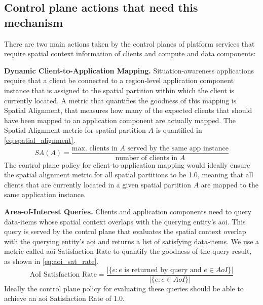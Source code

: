 \subsection{Control plane actions that need this mechanism}
There are two main actions taken by the control planes of platform services that require spatial context information of clients and compute and data components:
\par \noindent \textbf{Dynamic Client-to-Application Mapping. } Situation-awareness applications require that a client be connected to a region-level application component instance that is assigned to the spatial partition within which the client is currently located. A metric that quantifies the goodness of this mapping is Spatial Alignment, that measures how many of the expected clients that should have been mapped to an application component are actually mapped. The Spatial Alignment metric for spatial partition $A$ is quantified in \cref{eq:spatial_alignment}.
\begin{equation}
SA \left( A \right) = \dfrac{\text{max. clients in }A\text{ served by the same app instance}}{\text{number of clients in }A}
\label{eq:spatial_alignment}
\end{equation}
The control plane policy for client-to-application mapping would ideally ensure the spatial alignment metric for all spatial partitions to be 1.0, meaning that all clients that are currently located in a given spatial partition $A$ are mapped to the same application instance.

\par \noindent \textbf{Area-of-Interest Queries. } Clients and application components need to query data-items whose spatial context overlaps with the querying entity's \gls{aoi}. This query is served by the control plane that evaluates the spatial context overlap with the querying entity's \gls{aoi} and returns a list of satisfying data-items. We use a metric called \gls{aoi} Satisfaction Rate to quantify the goodness of the query result, as shown in \cref{eq:aoi_sat_rate}.
\begin{equation}
\text{AoI Satisfaction Rate} = \dfrac{|\{ e: e \text{ is returned by query  and } e \in AoI \}|}{|\{ e: e \in AoI \}|}
\label{eq:aoi_sat_rate}
\end{equation}
Ideally the control plane policy for evaluating these queries should be able to achieve an \gls{aoi} Satisfaction Rate of 1.0.

